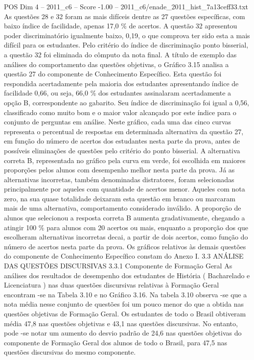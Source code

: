 \begin{textsample}{POS Dim 4 – 2011\_c6 – Score -1.00 – 2011\_c6/enade\_2011\_hist\_7a13ceff33.txt}
As questões 28 e 32 foram as mais difíceis dentre as 27 questões específicas, com baixo índice de facilidade, apenas 17,0 \% de acertos.
A questão 32 apresentou poder discriminatório igualmente baixo, 0,19, o que comprova ter sido esta a mais difícil para os estudantes.
Pelo critério do índice de discriminação ponto bisserial, a questão 32 foi eliminada do cômputo da nota final.
A título de exemplo das análises do comportamento das questões objetivas, o Gráfico 3.15 analisa a questão 27 do componente de Conhecimento Específico.
Esta questão foi respondida acertadamente pela maioria dos estudantes apresentando índice de facilidade 0,66, ou seja, 66,0 \% dos estudantes assinalaram acertadamente a opção B, correspondente ao gabarito.
Seu índice de discriminação foi igual a 0,56, classificado como muito bom e o maior valor alcançado por este índice para o conjunto de perguntas em análise.
Neste gráfico, cada uma das cinco curvas representa o percentual de respostas em determinada alternativa da questão 27, em função do número de acertos dos estudantes nesta parte da prova, antes de possíveis eliminações de questões pelo critério do ponto bisserial.
A alternativa correta B, representada no gráfico pela curva em verde, foi escolhida em maiores proporções pelos alunos com desempenho melhor nesta parte da prova.
Já as alternativas incorretas, também denominadas distratores, foram selecionadas principalmente por aqueles com quantidade de acertos menor.
Aqueles com nota zero, na sua quase totalidade deixaram esta questão em branco ou marcaram mais de uma alternativa, comportamento considerado inválido.
A proporção de alunos que selecionou a resposta correta B aumenta gradativamente, chegando a atingir 100 \% para alunos com 20 acertos ou mais, enquanto a proporção dos que escolheram alternativas incorretas decai, a partir de dois acertos, como função do número de acertos nesta parte da prova.
Os gráficos relativos às demais questões do componente de Conhecimento Específico constam do Anexo I. 3.3 ANÁLISE DAS QUESTÕES DISCURSIVAS 3.3.1 Componente de Formação Geral As análises dos resultados de desempenho dos estudantes de História ( Bacharelado e Licenciatura ) nas duas questões discursivas relativas à Formação Geral encontram -se na Tabela 3.10 e no Gráfico 3.16.
Na tabela 3.10 observa -se que a nota média nesse conjunto de questões foi um pouco menor do que a obtida nas questões objetivas de Formação Geral.
Os estudantes de todo o Brasil obtiveram média 47,8 nas questões objetivas e 43,1 nas questões discursivas.
No entanto, pode -se notar um aumento do desvio padrão de 24,6 nas questões objetivas do componente de Formação Geral dos alunos de todo o Brasil, para 47,5 nas questões discursivas do mesmo componente.

\end{textsample}
